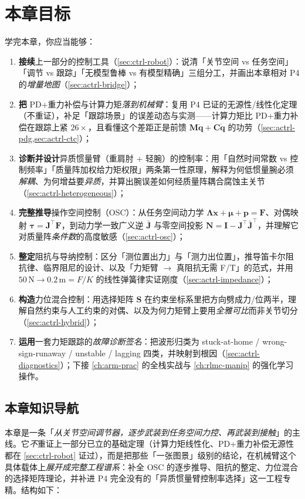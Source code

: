 \section*{本章目标}
学完本章，你应当能够：
\begin{enumerate}
  \item \textbf{接续}上一部分的控制工具（\cref{sec:ctrl-robot}）：说清「关节空间 vs 任务空间」「调节 vs 跟踪」「无模型鲁棒 vs 有模型精确」三组分工，并画出本章相对 P4 的\emph{增量地图}（\cref{sec:actrl-bridge}）；
  \item \textbf{把} PD+重力补偿与计算力矩\emph{落到机械臂}：复用 P4 已证的无源性/线性化定理（不重证），补足「跟踪场景」的误差动态与实测——计算力矩比 PD+重力补偿在跟踪上紧 $26\times$，且看懂这个差距正是前馈 $\mathbf{M}\ddot{\mathbf{q}}+\mathbf{C}\dot{\mathbf{q}}$ 的功劳（\cref{sec:actrl-pdg,sec:actrl-ctc}）；
  \item \textbf{诊断并设计}异质惯量臂（重肩肘 + 轻腕）的控制率：用「自然时间常数 vs 控制频率」「质量阵加权给力矩权限」两条第一性原理，解释为何低惯量腕必须\emph{解耦}、为何增益要\emph{异质}，并算出腕误差如何经质量阵耦合腐蚀主关节（\cref{sec:actrl-heterogeneous}）；
  \item \textbf{完整推导}操作空间控制（OSC）：从任务空间动力学 $\boldsymbol{\Lambda}\ddot{\mathbf{x}}+\boldsymbol{\mu}+\mathbf{p}=\mathbf{F}$、对偶映射 $\boldsymbol{\tau}=\mathbf{J}^\top\mathbf{F}$，到动力学一致广义逆 $\bar{\mathbf{J}}$ 与零空间投影 $\mathbf{N}=\mathbf{I}-\mathbf{J}^\top\bar{\mathbf{J}}^\top$，并理解它对质量阵\emph{条件数}的高度敏感（\cref{sec:actrl-osc}）；
  \item \textbf{整定}阻抗与导纳控制：区分「测位置出力」与「测力出位置」，推导笛卡尔阻抗律、临界阻尼的设计、以及「力矩臂 $\to$ 真阻抗无需 F/T」的范式，并用 $50\,\mathrm{N}\to0.2\,\mathrm{m}=F/K$ 的线性弹簧律实证刚度（\cref{sec:actrl-impedance}）；
  \item \textbf{构造}力位混合控制：用选择矩阵 $\mathbf{S}$ 在约束坐标系里把方向劈成力/位两半，理解自然约束与人工约束的对偶、以及为何力矩臂上要用\emph{全雅可比}而非关节切分（\cref{sec:actrl-hybrid}）；
  \item \textbf{运用}一套力矩跟踪的\emph{故障诊断签名}：把波形归类为 stuck-at-home / wrong-sign-runaway / unstable / lagging 四类，并映射到根因（\cref{sec:actrl-diagnostics}）；下接 \cref{ch:arm-prac} 的全栈实战与 \cref{ch:rlmc-manip} 的强化学习操作。
\end{enumerate}

\subsection*{本章知识导航}
本章是一条「\emph{从关节空间调节器，逐步武装到任务空间力控、再武装到接触}」的主线。它\emph{不}重证上一部分已立的基础定理（计算力矩线性化、PD+重力补偿无源性都在 \cref{sec:ctrl-robot} 证过），而是把那些「一张图景」级别的结论，在机械臂这个具体载体上\emph{展开成完整工程谱系}：补全 OSC 的逐步推导、阻抗的整定、力位混合的选择矩阵理论，并补进 P4 完全没有的「异质惯量臂控制率选择」这一工程专精。结构如下：

